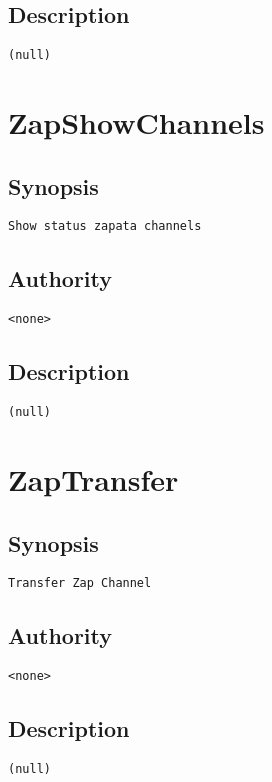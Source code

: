 \subsection{Description}
\begin{verbatim}
(null)
\end{verbatim}


\section{ZapShowChannels}
\subsection{Synopsis}
\begin{verbatim}
Show status zapata channels
\end{verbatim}
\subsection{Authority}
\begin{verbatim}
<none>
\end{verbatim}
\subsection{Description}
\begin{verbatim}
(null)
\end{verbatim}


\section{ZapTransfer}
\subsection{Synopsis}
\begin{verbatim}
Transfer Zap Channel
\end{verbatim}
\subsection{Authority}
\begin{verbatim}
<none>
\end{verbatim}
\subsection{Description}
\begin{verbatim}
(null)
\end{verbatim}


